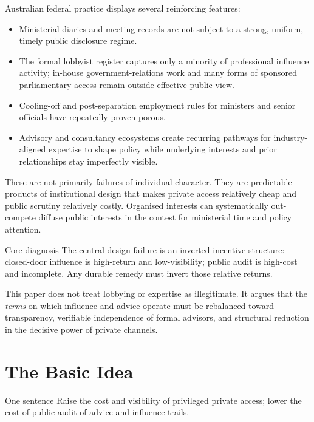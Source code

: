 \documentclass[11pt,a4paper]{article}
\begin{document}
Australian federal practice displays several reinforcing features:

\begin{itemize}[leftmargin=*]
    \item Ministerial diaries and meeting records are not subject to a strong, uniform, timely public disclosure regime.
    \item The formal lobbyist register captures only a minority of professional influence activity; in-house government-relations work and many forms of sponsored parliamentary access remain outside effective public view.
    \item Cooling-off and post-separation employment rules for ministers and senior officials have repeatedly proven porous.
    \item Advisory and consultancy ecosystems create recurring pathways for industry-aligned expertise to shape policy while underlying interests and prior relationships stay imperfectly visible.
\end{itemize}

These are not primarily failures of individual character. They are predictable products of institutional design that makes private access relatively cheap and public scrutiny relatively costly. Organised interests can systematically out-compete diffuse public interests in the contest for ministerial time and policy attention.

\begin{principlebox}{Core diagnosis}
The central design failure is an inverted incentive structure: closed-door influence is high-return and low-visibility; public audit is high-cost and incomplete. Any durable remedy must invert those relative returns.
\end{principlebox}

This paper does not treat lobbying or expertise as illegitimate. It argues that the \textit{terms} on which influence and advice operate must be rebalanced toward transparency, verifiable independence of formal advisors, and structural reduction in the decisive power of private channels.

\section{The Basic Idea}

\begin{principlebox}{One sentence}
Raise the cost and visibility of privileged private access; lower the cost of public audit of advice and influence trails.
\end{principlebox}
\end{document}
